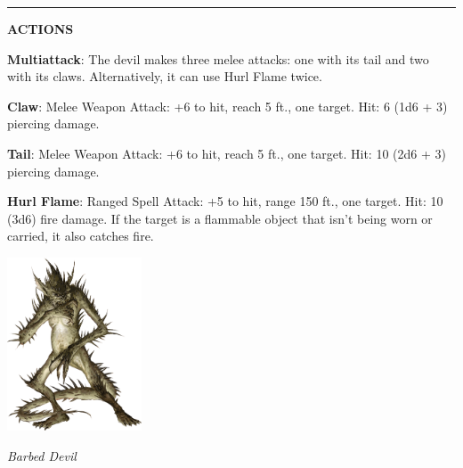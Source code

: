 \noindent\rule{0.5\textwidth}{0.5pt}

\noindent\textbf{ACTIONS}

\noindent\textbf{Multiattack}: The devil makes three melee attacks: one with its tail and two with its claws. Alternatively, it can use Hurl Flame twice.

\noindent\textbf{Claw}: Melee Weapon Attack: +6 to hit, reach 5 ft., one target. Hit: 6 (1d6 + 3) piercing damage.

\noindent\textbf{Tail}: Melee Weapon Attack: +6 to hit, reach 5 ft., one target. Hit: 10 (2d6 + 3) piercing damage.


\noindent\textbf{Hurl Flame}: Ranged Spell Attack: +5 to hit, range 150 ft., one target. Hit: 10 (3d6) fire damage. If the target is a flammable object that isn't being worn or carried, it also catches fire.

\begin{center}
	\includegraphics[width = 0.3\textwidth]{barbed-devil}
	
	\emph{Barbed Devil}
\end{center}